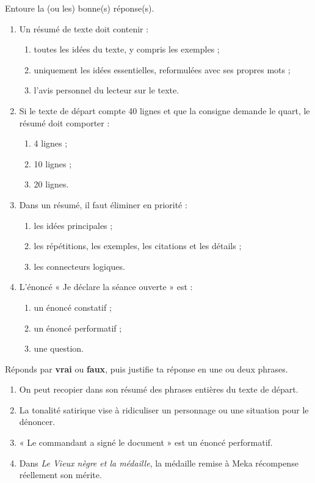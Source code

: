 \documentclass[11pt]{article}
\begin{document}
\begin{exercice}
Entoure la (ou les) bonne(s) réponse(s).
\begin{enumerate}
\item Un résumé de texte doit contenir :
\begin{enumerate}
\item toutes les idées du texte, y compris les exemples ;
\item uniquement les idées essentielles, reformulées avec ses propres mots ;
\item l'avis personnel du lecteur sur le texte.
\end{enumerate}
\item Si le texte de départ compte 40 lignes et que la consigne demande le quart, le résumé doit comporter :
\begin{enumerate}
\item 4 lignes ; \item 10 lignes ; \item 20 lignes.
\end{enumerate}
\item Dans un résumé, il faut éliminer en priorité :
\begin{enumerate}
\item les idées principales ;
\item les répétitions, les exemples, les citations et les détails ;
\item les connecteurs logiques.
\end{enumerate}
\item L'énoncé « Je déclare la séance ouverte » est :
\begin{enumerate}
\item un énoncé constatif ; \item un énoncé performatif ; \item une question.
\end{enumerate}
\end{enumerate}
\end{exercice}

\begin{exercice}
Réponds par \textbf{vrai} ou \textbf{faux}, puis justifie ta réponse en une ou deux phrases.
\begin{enumerate}
\item On peut recopier dans son résumé des phrases entières du texte de départ.
\item La tonalité satirique vise à ridiculiser un personnage ou une situation pour le dénoncer.
\item « Le commandant a signé le document » est un énoncé performatif.
\item Dans \emph{Le Vieux nègre et la médaille}, la médaille remise à Meka récompense réellement son mérite.
\end{enumerate}
\end{exercice}
\end{document}
